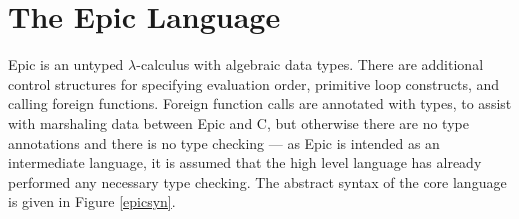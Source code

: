 \section{The Epic Language}

Epic is an untyped $\lambda$-calculus with algebraic data types.
There are additional control structures for specifying evaluation
order, primitive loop constructs, and calling foreign
functions. Foreign function calls are annotated with types, to assist
with marshaling data between Epic and C, but otherwise there are no
type annotations and there is no type checking --- as Epic is intended
as an intermediate language, it is assumed that the high level
language has already performed any necessary type checking. The
abstract syntax of the core language is given in Figure \ref{epicsyn}.

\newcommand{\Con}[2]{\DC{Con}\:#1(#2)}

